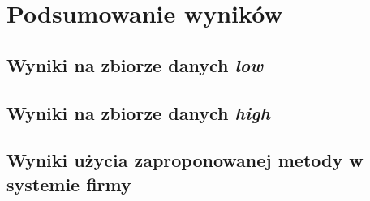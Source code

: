 \section{Podsumowanie wyników}

\subsection{Wyniki na zbiorze danych \textit{low}}
\subsection{Wyniki na zbiorze danych \textit{high}}
\subsection{Wyniki użycia zaproponowanej metody w systemie firmy \blue{}}
\TODO{}






